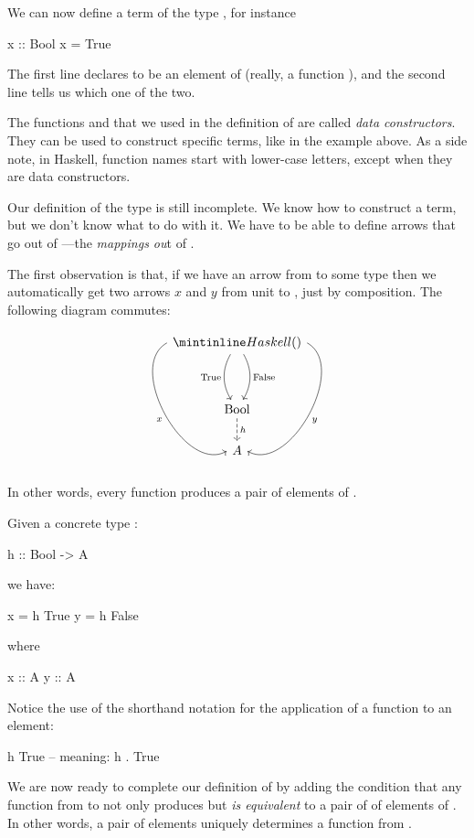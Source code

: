 \documentclass[DaoFP]{subfiles}
\begin{document}
We can now define a term of the type , for instance
\begin{haskell}
x :: Bool
x = True
\end{haskell}
The first line declares  to be an element of  (really, a function ), and the second line tells us which one of the two.

The functions  and  that we used in the definition of  are called \emph{data constructors}. They can be used to construct specific terms, like in the example above. As a side note, in Haskell, function names start with lower-case letters, except when they are data constructors. 

Our definition of the type  is still incomplete. We know how to construct a  term, but we don't know what to do with it. We have to be able to define arrows that go out of ---the \emph{mappings ou}t of . 

The first observation is that, if we have an arrow  from  to some type  then we automatically get two arrows $x$ and $y$ from unit to , just by composition. The following diagram commutes:

\[
 \begin{tikzcd}
 \hask{()}
 \arrow[dd, bend right, "\text{True}"']
 \arrow[dd, bend left, "\text{False}"]
  \arrow[ddd, bend right =90, "x"']
 \arrow[ddd, bend left=90, "y"]
\\
 \\
\text{Bool}
\arrow[d, dashed, "h"]
\\
A
 \end{tikzcd}
\]
In other words, every function  produces a pair of elements of .

Given a concrete type :
\begin{haskell}
h :: Bool -> A
\end{haskell}
we have:
\begin{haskell}
x = h True
y = h False
\end{haskell}
where
\begin{haskell}
x :: A
y :: A
\end{haskell}
Notice the use of the shorthand notation for the application of a function to an element:
\begin{haskell}
h True -- meaning: h . True
\end{haskell}

We are now ready to complete our definition of  by adding the condition that any function from  to  not only produces but \emph{is equivalent} to a pair of of elements of . In other words, a pair of elements uniquely determines a function from . 
\end{document}

